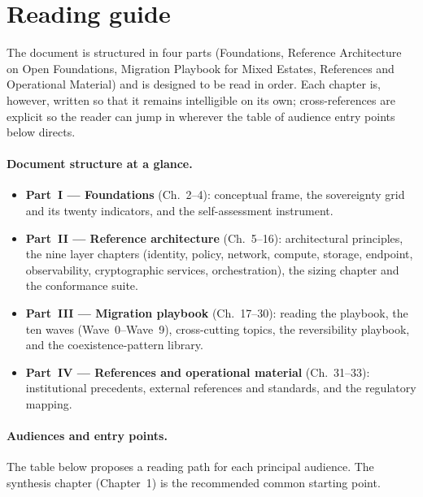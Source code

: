 
\section*{Reading guide}

The document is structured in four parts (Foundations, Reference
Architecture on Open Foundations, Migration Playbook for Mixed
Estates, References and Operational Material) and is designed to
be read in order. Each chapter is, however, written so that it
remains intelligible on its own; cross-references are explicit so
the reader can jump in wherever the table of audience entry
points below directs.

\paragraph{Document structure at a glance.}
\begin{itemize}[leftmargin=1.5em,nosep]
  \item \textbf{Part~I --- Foundations} (Ch.~2--4): conceptual frame,
    the sovereignty grid and its twenty indicators, and the
    self-assessment instrument.
  \item \textbf{Part~II --- Reference architecture} (Ch.~5--16):
    architectural principles, the nine layer chapters (identity,
    policy, network, compute, storage, endpoint, observability,
    cryptographic services, orchestration), the sizing chapter and
    the conformance suite.
  \item \textbf{Part~III --- Migration playbook} (Ch.~17--30):
    reading the playbook, the ten waves (Wave~0--Wave~9),
    cross-cutting topics, the reversibility playbook, and the
    coexistence-pattern library.
  \item \textbf{Part~IV --- References and operational material}
    (Ch.~31--33): institutional precedents, external references and
    standards, and the regulatory mapping.
\end{itemize}

\paragraph{Audiences and entry points.} The table below proposes a
reading path for each principal audience. The synthesis chapter
(Chapter~1) is the recommended common starting point.

